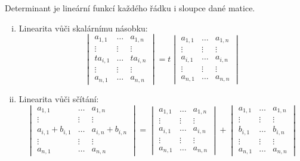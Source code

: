 \begin{proposition}
    \label{prop:linearitadet}
    Determinant je lineární funkcí každého řádku i sloupce dané matice.
    \begin{enumerate}[i.]
        \item Linearita vůči skalárnímu násobku:
            $$\begin{vmatrix}
                  a_{1,1} &\dots &a_{1,n} \\
                \vdots &\vdots &\vdots \\
                ta_{i,1} &\dots &ta_{i,n} \\
                \vdots &\vdots &\vdots \\
                a_{n,1} &\dots &a_{n,n} 
            \end{vmatrix} = t \begin{vmatrix}
                  a_{1,1} &\dots &a_{1,n} \\
                \vdots &\vdots &\vdots \\
                a_{i,1} &\dots &a_{i,n} \\
                \vdots &\vdots &\vdots \\
                a_{n,1} &\dots &a_{n,n} 
            \end{vmatrix}$$
         \item Linearita vůči sčítání:
            $$\begin{vmatrix}
                  a_{1,1} &\dots &a_{1,n} \\
                \vdots &\vdots &\vdots \\
                a_{i,1}+b_{i,1} &\dots &a_{i,n}+b_{i,n}\\
                \vdots &\vdots &\vdots \\
                a_{n,1} &\dots &a_{n,n} 
            \end{vmatrix} = \begin{vmatrix}
                  a_{1,1} &\dots &a_{1,n} \\
                \vdots &\vdots &\vdots \\
                a_{i,1} &\dots &a_{i,n} \\
                \vdots &\vdots &\vdots \\
                a_{n,1} &\dots &a_{n,n} 
            \end{vmatrix} + \begin{vmatrix}
                  a_{1,1} &\dots &a_{1,n} \\
                \vdots &\vdots &\vdots \\
                b_{i,1} &\dots &b_{i,n} \\
                \vdots &\vdots &\vdots \\
                a_{n,1} &\dots &a_{n,n} 
            \end{vmatrix}$$
       \end{enumerate}
\end{proposition}

